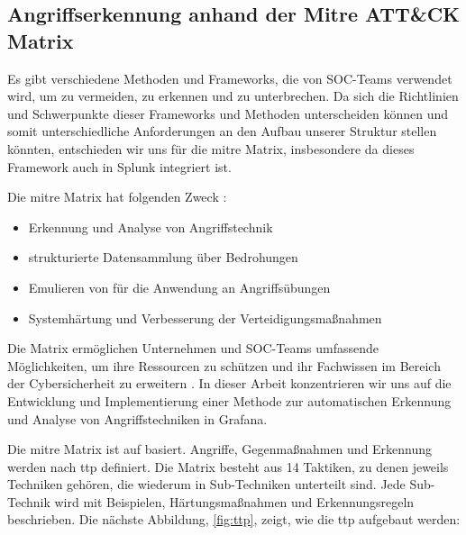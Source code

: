 \subsection{Angriffserkennung anhand der Mitre ATT\&CK Matrix}
Es gibt verschiedene Methoden und Frameworks, die von \gls{SOC}-Teams verwendet wird, um  zu vermeiden, zu erkennen und zu unterbrechen.  Da sich die Richtlinien und Schwerpunkte dieser Frameworks und Methoden unterscheiden können und somit unterschiedliche Anforderungen an den Aufbau unserer Struktur stellen könnten, entschieden wir uns für die \gls{mitre} Matrix, insbesondere da dieses Framework auch in Splunk integriert ist. 

Die \gls{mitre} Matrix hat folgenden Zweck \citep{Mitre_Started}:

{
\begin{itemize}[noitemsep]
   \item Erkennung und Analyse von Angriffstechnik
   \item	strukturierte Datensammlung über Bedrohungen
   \item	Emulieren von  für die Anwendung an Angriffsübungen
   \item	Systemhärtung und Verbesserung der Verteidigungsmaßnahmen
\end{itemize}
}

Die Matrix ermöglichen Unternehmen und \gls{SOC}-Teams umfassende Möglichkeiten, um ihre Ressourcen zu schützen und ihr Fachwissen im Bereich der \gls{Cybersicherheit} zu erweitern \citep{Hazel_howtousemitre}. In dieser Arbeit konzentrieren wir uns auf die Entwicklung und Implementierung einer Methode zur automatischen Erkennung und Analyse von Angriffstechniken in Grafana.

Die \gls{mitre} Matrix ist auf  basiert. Angriffe, Gegenmaßnahmen und Erkennung werden nach \gls{ttp} definiert. Die Matrix besteht aus 14 Taktiken, zu denen jeweils Techniken gehören, die wiederum in Sub-Techniken unterteilt sind. Jede Sub-Technik wird mit Beispielen, Härtungsmaßnahmen und Erkennungsregeln beschrieben. Die nächste Abbildung, \ref{fig:ttp}, zeigt, wie die \gls{ttp} aufgebaut werden:

